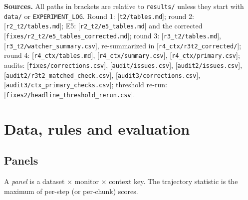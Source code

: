 \documentclass[11pt]{article}
\newcommand{\src}[1]{{\footnotesize\textcolor{ink2}{[\nolinkurl{#1}]}}}
\begin{document}
\textbf{Sources.} All paths in brackets are relative to \texttt{results/} unless they start with \texttt{data/} or \texttt{EXPERIMENT\_LOG}. Round 1: \src{t2/tables.md}; round 2: \src{r2_t2/tables.md}; E5: \src{r2_t2/e5_tables.md} and the corrected \src{fixes/r2_t2/e5_tables_corrected.md}; round 3: \src{r3_t2/tables.md}, \src{r3_t2/watcher_summary.csv}, re-summarized in \src{r4_ctx/r3t2_corrected/}; round 4: \src{r4_ctx/tables.md}, \src{r4_ctx/summary.csv}, \src{r4_ctx/primary.csv}; audits: \src{fixes/corrections.csv}, \src{audit/issues.csv}, \src{audit2/issues.csv}, \src{audit2/r3t2_matched_check.csv}, \src{audit3/corrections.csv}, \src{audit3/ctx_primary_checks.csv}; threshold re-run: \src{fixes2/headline_threshold_rerun.csv}.

\section{Data, rules and evaluation}
\subsection{Panels}
A \emph{panel} is a dataset $\times$ monitor $\times$ context key. The trajectory statistic is the maximum of per-step (or per-chunk) scores.
\end{document}
